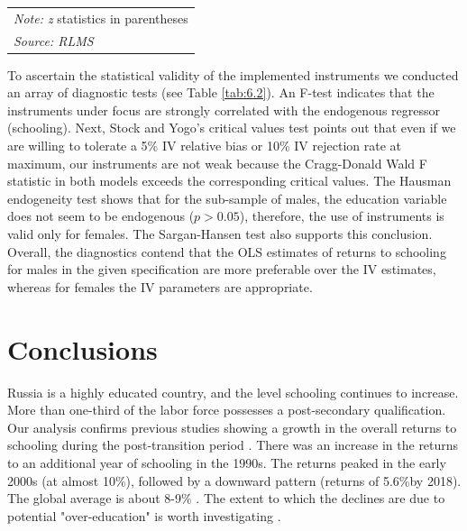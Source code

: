 \documentclass[alpha-refs]{wiley-article-01g}
\begin{document}
\begin{table}[h!]
\begin{tabular}{l*{2}{c}}
		\hline\hline
		\multicolumn{3}{l}{\footnotesize  \textit{Note: z} statistics in parentheses}\\
		\multicolumn{3}{l}{\footnotesize  \textit{Source: RLMS}}\\
	\end{tabular}
\end{table}

To ascertain the statistical validity of the implemented instruments we 
conducted an array of diagnostic tests (see Table \ref{tab:6.2}). An F-test 
indicates that the instruments under focus are strongly correlated with the 
endogenous regressor (schooling). Next,  Stock and Yogo's critical values 
test points out that even if we are willing to tolerate a 5\% IV relative 
bias or 10\% IV rejection rate at maximum, our instruments are not weak 
because the Cragg-Donald Wald F statistic in both models exceeds the 
corresponding critical values. The Hausman endogeneity test shows that for 
the sub-sample of males, the education variable does not seem to be 
endogenous ($p>0.05$), therefore, the use of instruments is valid only for 
females. The Sargan-Hansen test also supports this conclusion. Overall, the 
diagnostics contend that the OLS estimates of returns to schooling for 
males in the given specification are more preferable over the IV estimates, 
whereas for females the IV parameters are appropriate.

\section{Conclusions}

Russia is a highly educated country, and the level schooling continues to 
increase. More than one-third of the labor force possesses a post-secondary 
qualification. Our analysis confirms previous studies showing a growth in 
the overall returns to schooling during the post-transition period 
\parencite{Brainerd1998,Clark2003,Vernon2002}. There was an increase in the 
returns to an additional year of schooling in the 1990s. The returns peaked 
in the early 2000s (at almost 10\%), followed by a downward pattern 
(returns of 5.6\%by 2018). The global average is about 8-9\% 
\parencite{Psacharopoulos_Patrinos2018}. The extent to which the declines 
are due to potential "over-education" is worth investigating 
\parencite{Gimpelson2019}.
\end{document}
